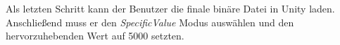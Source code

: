 Als letzten Schritt kann der Benutzer die finale binäre Datei in Unity laden. Anschließend muss er den \textit{SpecificValue} Modus auswählen und den hervorzuhebenden Wert auf 5000 setzten.













































